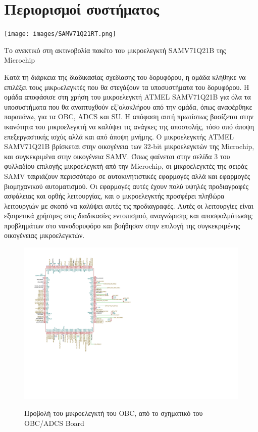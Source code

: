 \documentclass[a4paper,nobib,justified]{tufte-book}
\begin{document}
\clearpage
\section{Περιορισμοί συστήματος}

\begin{marginfigure}
	\centering
	\texttt{[image: images/SAMV71Q21RT.png]}
	\label{fig:samv71-rad-mcu}
	\caption[Το ανεκτικό στη ακτινοβολία πακέτο του μικροελεγκτή SAMV71Q21B της Microchip]{Το ανεκτικό στη ακτινοβολία πακέτο του μικροελεγκτή SAMV71Q21B της Microchip}
\end{marginfigure}

Κατά τη διάρκεια της διαδικασίας σχεδίασης του δορυφόρου, η ομάδα κλήθηκε να επιλέξει τους μικρoελεγκτές που θα στεγάζουν τα υποσυστήματα του δορυφόρου. Η ομάδα αποφάσισε στη χρήση του μικροελεγκτή ATMEL SAMV71Q21B για όλα τα υποσυστήματα που θα αναπτυχθούν εξ'ολοκλήρου από την ομάδα, όπως αναφέρθηκε παραπάνω, για τα OBC, ADCS και SU. Η απόφαση αυτή πρωτίστως βασίζεται στην ικανότητα του μικροελεγκτή να καλύψει τις ανάγκες της αποστολής, τόσο από άποψη επεξεργαστικής ισχύς αλλά και από άποψη μνήμης. Ο μικροελεγκτής ATMEL SAMV71Q21B βρίσκεται στην οικογένεια των 32-bit μικροελεγκτών της Microchip, και συγκεκριμένα στην οικογένεια SAMV. Όπως φαίνεται στην σελίδα 3 του φυλλαδίου επιλογής μικροελεγκτή από την Microchip, οι μικροελεγκτές της σειράς SAMV ταιριάζουν περισσότερο σε αυτοκινητιστικές εφαρμογές αλλά και εφαρμογές βιομηχανικού αυτοματισμού. Οι εφαρμογές αυτές έχουν πολύ υψηλές προδιαγραφές ασφάλειας και ορθής λειτουργίας, και ο μικροελεγκτής προσφέρει πληθώρα λειτουργιών με σκοπό να καλύψει αυτές τις προδιαγραφές. Αυτές οι λειτουργίες είναι εξαιρετικά χρήσιμες στις διαδικασίες εντοπισμού, αναγνώρισης και αποσφαλμάτωσης προβλημάτων στο νανοδορυφόρο και βοήθησαν στην επιλογή της συγκεκριμένης οικογένειας μικροελεγκτών.

\begin{figure}[hb]
	\includegraphics[width=0.8\linewidth]{media/diagrams/obc-mcu-schematic.pdf}
	\label{diag:obc-mcu-schematic}
	\caption{Προβολή του μικροελεγκτή του OBC, από το σχηματικό του OBC/ADCS Board}
\end{figure}
\end{document}

